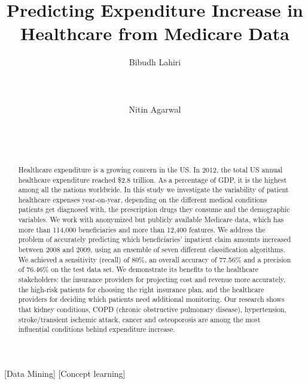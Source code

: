 \documentclass{sig-alternate}
\begin{document}
\title{Predicting Expenditure Increase in Healthcare from Medicare Data}

\author{
\alignauthor
Bibudh Lahiri\\
       \\
       \\
       \\
\alignauthor
Nitin Agarwal\\
       \\
       \\
       \\
}

\maketitle
\begin{abstract}
Healthcare expenditure is a growing concern in the US. In 2012, the total US annual healthcare expenditure reached \$2.8 trillion. As a percentage of GDP, it is the highest among all the nations worldwide. In this study we investigate the variability of patient healthcare expenses year-on-year, depending on the different medical conditions patients get diagnosed with, the prescription drugs they consume and the demographic variables. We work with anonymized but publicly available Medicare data, which has more than 114,000 beneficiaries and more than 12,400 features. We address the problem of accurately predicting which beneficiaries' inpatient claim amounts increased between 2008 and 2009, using an ensemble of seven different classification algorithms. We achieved a sensitivity (recall) of 80\%, an overall accuracy of 77.56\% and a precision of 76.46\% on the test data set. We demonstrate its benefits to the healthcare stakeholders: the insurance providers for projecting cost and revenue more accurately, the high-risk patients for choosing the right insurance plan, and the healthcare providers for deciding which patients need additional monitoring. Our research shows that kidney conditions, COPD (chronic obstructive pulmonary disease), hypertension, stroke/transient ischemic attack, cancer and osteoporosis are among the most influential conditions behind expenditure increase.  
\end{abstract}

[Data Mining]
[Concept learning]










  
\end{document}
